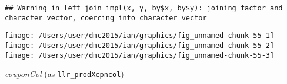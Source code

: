 \documentclass[10pt]{report}
\newenvironment{Shaded}{}{}
\newcommand{\KeywordTok}[1]{\textcolor[rgb]{0.00,0.44,0.13}{\textbf{{#1}}}}
\newcommand{\DataTypeTok}[1]{\textcolor[rgb]{0.56,0.13,0.00}{{#1}}}
\newcommand{\StringTok}[1]{\textcolor[rgb]{0.25,0.44,0.63}{{#1}}}
\newcommand{\NormalTok}[1]{{#1}}
\begin{document}
\begin{Shaded}
\end{Shaded}

\begin{verbatim}
## Warning in left_join_impl(x, y, by$x, by$y): joining factor and character vector, coercing into character vector
\end{verbatim}

\begin{Shaded}
\end{Shaded}

\begin{center}\texttt{[image: /Users/user/dmc2015/ian/graphics/fig\_unnamed-chunk-55-1]} \texttt{[image: /Users/user/dmc2015/ian/graphics/fig\_unnamed-chunk-55-2]} \texttt{[image: /Users/user/dmc2015/ian/graphics/fig\_unnamed-chunk-55-3]} \end{center}

\emph{couponCol} (as \texttt{llr\_prodXcpncol})
\end{document}
